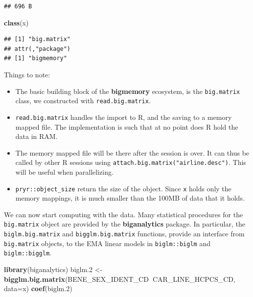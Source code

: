 \documentclass[]{book}
\newenvironment{Shaded}{\begin{snugshade}}{\end{snugshade}}
\newcommand{\KeywordTok}[1]{\textcolor[rgb]{0.13,0.29,0.53}{\textbf{#1}}}
\newcommand{\DataTypeTok}[1]{\textcolor[rgb]{0.13,0.29,0.53}{#1}}
\newcommand{\DecValTok}[1]{\textcolor[rgb]{0.00,0.00,0.81}{#1}}
\newcommand{\StringTok}[1]{\textcolor[rgb]{0.31,0.60,0.02}{#1}}
\newcommand{\OperatorTok}[1]{\textcolor[rgb]{0.81,0.36,0.00}{\textbf{#1}}}
\newcommand{\NormalTok}[1]{#1}
\providecommand{\tightlist}{%
  \setlength{\itemsep}{0pt}\setlength{\parskip}{0pt}}
\theoremstyle{definition}
\theoremstyle{definition}
\theoremstyle{definition}
\theoremstyle{remark}
\begin{document}
\begin{verbatim}
## 696 B
\end{verbatim}

\begin{Shaded}
\begin{Highlighting}[]
\KeywordTok{class}\NormalTok{(x)}
\end{Highlighting}
\end{Shaded}

\begin{verbatim}
## [1] "big.matrix"
## attr(,"package")
## [1] "bigmemory"
\end{verbatim}

Things to note:

\begin{itemize}
\tightlist
\item
  The basic building block of the \textbf{bigmemory} ecosystem, is the
  \texttt{big.matrix} class, we constructed with
  \texttt{read.big.matrix}.
\item
  \texttt{read.big.matrix} handles the import to R, and the saving to a
  memory mapped file. The implementation is such that at no point does R
  hold the data in RAM.
\item
  The memory mapped file will be there after the session is over. It can
  thus be called by other R sessions using
  \texttt{attach.big.matrix("airline.desc")}. This will be useful when
  parallelizing.
\item
  \texttt{pryr::object\_size} return the size of the object. Since
  \texttt{x} holds only the memory mappings, it is much smaller than the
  100MB of data that it holds.
\end{itemize}

We can now start computing with the data. Many statistical procedures
for the \texttt{big.matrix} object are provided by the
\textbf{biganalytics} package. In particular, the
\texttt{biglm.big.matrix} and \texttt{bigglm.big.matrix} functions,
provide an interface from \texttt{big.matrix} objects, to the EMA linear
models in \texttt{biglm::biglm} and \texttt{biglm::bigglm}.

\begin{Shaded}
\begin{Highlighting}[]
\KeywordTok{library}\NormalTok{(biganalytics)}
\NormalTok{biglm.}\DecValTok{2}\NormalTok{ <-}\StringTok{ }\KeywordTok{bigglm.big.matrix}\NormalTok{(BENE_SEX_IDENT_CD}\OperatorTok{~}\NormalTok{CAR_LINE_HCPCS_CD, }\DataTypeTok{data=}\NormalTok{x)}
\KeywordTok{coef}\NormalTok{(biglm.}\DecValTok{2}\NormalTok{)}
\end{Highlighting}
\end{Shaded}
\end{document}
